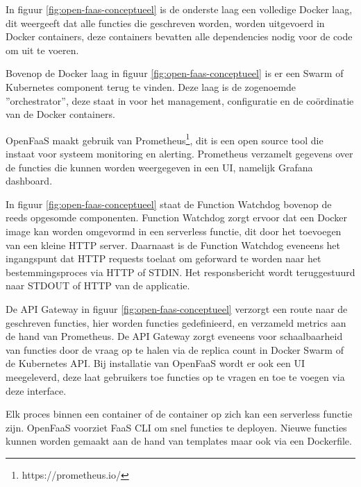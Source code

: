 \begin{description}[style=unboxed, labelwidth=\linewidth, listparindent =0pt]
    \item[Docker laag]
    In figuur \ref{fig:open-faas-conceptueel} is de onderste laag een volledige Docker laag, dit weergeeft dat alle functies die geschreven worden, worden uitgevoerd in Docker containers, deze containers bevatten alle dependencies nodig voor de code om uit te voeren.
    \newline
    
    \item[Swarm/Kubernetes]
    Bovenop de Docker laag in figuur \ref{fig:open-faas-conceptueel} is er een Swarm of Kubernetes component terug te vinden. Deze laag is de zogenoemde ''orchestrator'', deze staat in voor het management, configuratie en de coördinatie van de Docker containers.
    \newline
    
    \item[Prometheus]
    OpenFaaS maakt gebruik van Prometheus\footnote{https://prometheus.io/}, dit is een open source tool die instaat voor systeem monitoring en alerting. Prometheus verzamelt gegevens over de functies die kunnen worden weergegeven in een UI, namelijk Grafana dashboard.
    \newline
    
    \item[Function Watchdog]
    In figuur \ref{fig:open-faas-conceptueel} staat de Function Watchdog bovenop de reeds opgesomde componenten. Function Watchdog zorgt ervoor dat een Docker image kan worden omgevormd in een serverless functie, dit door het toevoegen van een kleine HTTP server. Daarnaast is de Function Watchdog eveneens het ingangspunt dat HTTP requests toelaat om geforward te worden naar het bestemmingsproces via HTTP of STDIN. Het responsbericht wordt teruggestuurd naar STDOUT of HTTP van de applicatie. \autocite{Ellis2019}
    \newline
    
    \item[API Gateway/UI Portal]
    De API Gateway in figuur \ref{fig:open-faas-conceptueel} verzorgt een route naar de geschreven functies, hier worden functies gedefinieerd, en verzameld metrics aan de hand van Prometheus. De API Gateway zorgt eveneens voor schaalbaarheid van functies door de vraag op te halen via de replica count in Docker Swarm of de Kubernetes API. Bij installatie van OpenFaaS wordt er ook een UI meegeleverd, deze laat gebruikers toe functies op te vragen en toe te voegen via deze interface. \autocite{Ellis2019} 
    \newline
    
    \item[CLI]
    Elk proces binnen een container of de container op zich kan een serverless functie zijn. OpenFaaS voorziet FaaS CLI om snel functies te deployen. Nieuwe functies kunnen worden gemaakt aan de hand van templates maar ook via een Dockerfile. \autocite{Ellis2019}  
\end{description}

